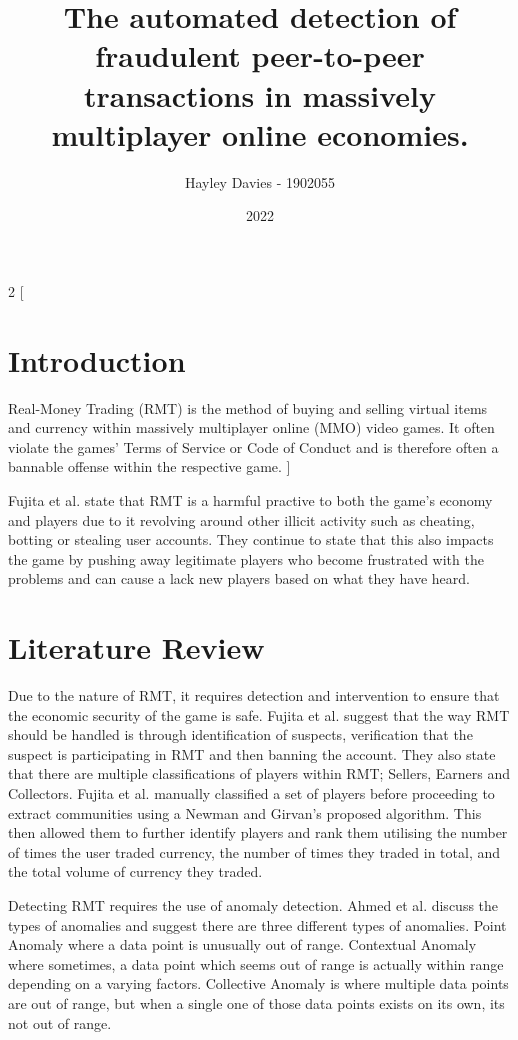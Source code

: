 \documentclass{article}
\title{The automated detection of fraudulent peer-to-peer transactions in massively multiplayer online economies.}
\author{Hayley Davies - 1902055}
\date{2022}
\begin{document}
\begin{titlepage}
        \maketitle
\end{titlepage}

\begin{multicols}{2}
    [
        \section{Introduction}
        Real-Money Trading (RMT) is the method of buying and selling virtual items and currency within massively multiplayer online (MMO) video games. It often violate the games' Terms of Service or Code of Conduct and is therefore often a bannable offense within the respective game.\cite{AmazonGamesCOC}\cite{SquareEnixCOC}
    ]

Fujita et al. state that RMT is a harmful practive to both the game's economy and players due to it revolving around other illicit activity such as cheating, botting or stealing user accounts. They continue to state that this also impacts the game by pushing away legitimate players who become frustrated with the problems and can cause a lack new players based on what they have heard.\cite{Fujita2011}

\section{Literature Review}
Due to the nature of RMT, it requires detection and intervention to ensure that the economic security of the game is safe. Fujita et al. suggest that the way RMT should be handled is through identification of suspects, verification that the suspect is participating in RMT and then banning the account. They also state that there are multiple classifications of players within RMT; Sellers, Earners and Collectors.\cite{Fujita2011} Fujita et al. manually classified a set of players before proceeding to extract communities using a Newman and Girvan's proposed algorithm. This then allowed them to further identify players and rank them utilising the number of times the user traded currency, the number of times they traded in total, and the total volume of currency they traded.

Detecting RMT requires the use of anomaly detection. Ahmed et al. discuss the types of anomalies and suggest there are three different types of anomalies. Point Anomaly where a data point is unusually out of range. Contextual Anomaly where sometimes, a data point which seems out of range is actually within range depending on a varying factors. Collective Anomaly is where multiple data points are out of range, but when a single one of those data points exists on its own, its not out of range.\cite{Ahmed2016}




\end{multicols}
\end{document}
